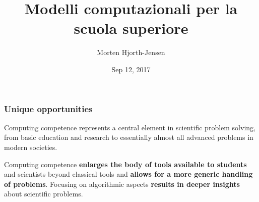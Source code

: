\documentclass{beamer}
\begin{document}

\newcommand{\exercisesection}[1]{\subsection*{#1}}







\title{Modelli computazionali per la scuola superiore}


\author{Morten Hjorth-Jensen}

\date{Sep 12, 2017
}

\begin{frame}
\titlepage
\end{frame}

\begin{frame}
\frametitle{Unique opportunities}

\begin{block}{}
Computing competence represents a central element
in scientific problem solving, from basic education and research to
essentially almost all advanced problems in modern
societies.

Computing competence \textbf{enlarges the body of tools available to students} and
scientists beyond classical tools and \textbf{allows for a more generic
handling of problems}. Focusing on algorithmic aspects \textbf{results in
deeper insights} about scientific problems.
\end{block}
\end{frame}
\end{document}
